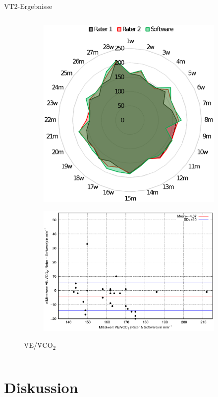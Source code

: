 \documentclass[colorBG,slideColor,8pt]{beamer}
\newcommand{\vcotwo}{\.{V}CO\textsubscript{2}}
\newcommand{\ve}{\.{V}E}
\begin{document}
\begin{frame}[fragile]{VT2-Ergebnisse}
\begin{columns}
\begin{column}{0.5\linewidth}
\begin{figure}
\begin{subfigure}{0.9\linewidth}
				\includegraphics[width=0.6\linewidth]{Bilder/vevco2_net.eps}
			\end{subfigure}
			\begin{subfigure}{0.9\linewidth}
				\centering
				\includegraphics[width=0.82\linewidth]{Bilder/vevco2.eps}
			\end{subfigure}	
		\caption{\ve/\vcotwo}
		\end{figure}
	\end{column}
\end{columns}
\end{frame}

\section{Diskussion}
\begin{frame}
\tableofcontents[currentsection]
\end{frame}
\end{document}
